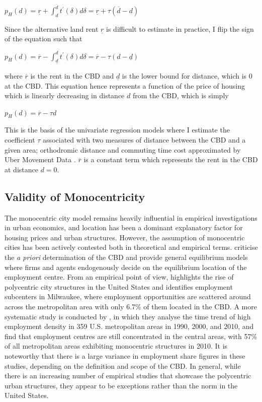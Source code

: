 \documentclass{article}
\begin{document}
\begin{center}
$p _ { H } ( d ) = \underline { r } + \int _ { d } ^ { \overline { d } } t ^ { \prime } ( \delta ) d \delta = \underline { r } + \tau ( \overline { d } - d )$
\end{center}
Since the alternative land rent $\underline{r}$ is difficult to estimate in practice, I flip the sign of the equation such that 
\begin{center}
$p _ { H } ( d ) = \overline { r } - \int _ { \underline { d } } ^ { d } t ^ { \prime } ( \delta ) d \delta = \overline { r } - \tau ( d - \underline { d } )$
\end{center}
where $\overline{r}$ is the rent in the CBD and $\underline{d}$ is the lower bound for distance, which is 0 at the CBD. This equation hence represents a function of the price of housing which is linearly decreasing in distance $d$ from the CBD, which is simply
\begin{center}
$p _ { H } ( d ) = \overline { r } - \tau d$
\end{center}
This is the basis of the univariate regression models where I estimate the coefficient $\tau$ associated with two measures of distance between the CBD and a given area; orthodromic distance and commuting time cost approximated by Uber Movement Data \citep{UberMovement2019MovementCities}. $\overline{r}$ is a constant term which represents the rent in the CBD at distance $d = 0$.

\subsection{Validity of Monocentricity} \label{subsection:monocentricity}
The monocentric city model remains heavily influential in empirical investigations in urban economics, and location has been a dominant explanatory factor for housing prices and urban structures. However, the assumption of monocentric cities has been actively contested both in theoretical and empirical terms. \citet{RePEc:eee:regeco:v:12:y:1982:i:2:p:161-196} criticise the \textit{a priori} determination of the CBD and provide general equilibrium models where firms and agents endogenously decide on the equilibrium location of the employment centre.
From an empirical point of view, \citet{McMillen2001PolycentricMilwaukee.} highlights the rise of polycentric city structures in the United States and identifies employment subcenters in Milwaukee, where employment opportunities are scattered around across the metropolitan area with only 6.7\% of them located in the CBD. A more systematic study is conducted by \citet{Arribas-Bel2014The2010}, in which they analyse the time trend of high employment density in 359 U.S. metropolitan areas in 1990, 2000, and 2010, and find that employment centres are still concentrated in the central areas, with 57\% of all metropolitan areas exhibiting monocentric structures in 2010. It is noteworthy that there is a large variance in employment share figures in these studies, depending on the definition and scope of the CBD. In general, while there is an increasing number of empirical studies that showcase the polycentric urban structures, they appear to be exceptions rather than the norm in the United States.
\end{document}
